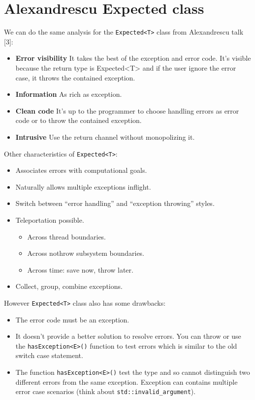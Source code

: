 \documentclass[a4paper,10pt]{article}
\newcommand{\cpp}[1]{\lstinline{#1}}
\begin{document}
\section{Alexandrescu Expected class}

We can do the same analysis for the \cpp{Expected<T>} class from Alexandrescu talk [3]:

\begin{itemize}
 \item \textbf{Error visibility} It takes the best of the exception and error code. It's visible because the return type is Expected<T> and if the user ignore the error case, it throws the contained exception.
 \item \textbf{Information} As rich as exception.
 \item \textbf{Clean code} It's up to the programmer to choose handling errors as error code or to throw the contained exception.
 \item \textbf{Intrusive} Use the return channel without monopolizing it.
\end{itemize}

\noindent
Other characteristics of \cpp{Expected<T>}:

\begin{itemize}
 \item Associates errors with computational goals.
 \item Naturally allows multiple exceptions inflight.
 \item Switch between ``error handling'' and ``exception throwing'' styles.
 \item Teleportation possible.
 \begin{itemize}
  \item Across thread boundaries.
  \item Across nothrow subsystem boundaries.
  \item Across time: save now, throw later.
 \end{itemize}
 \item Collect, group, combine exceptions.
\end{itemize}

\noindent
However \cpp{Expected<T>} class also has some drawbacks:
\begin{itemize}
 \item The error code must be an exception.
 \item It doesn't provide a better solution to resolve errors. You can throw or use the \cpp{hasException<E>()} function to test errors which is similar to the old switch case statement.
 \item The function \cpp{hasException<E>()} test the type and so cannot distinguish two different errors from the same exception. Exception can contains multiple error case scenarios (think about \cpp{std::invalid_argument}).
\end{itemize}
\end{document}
